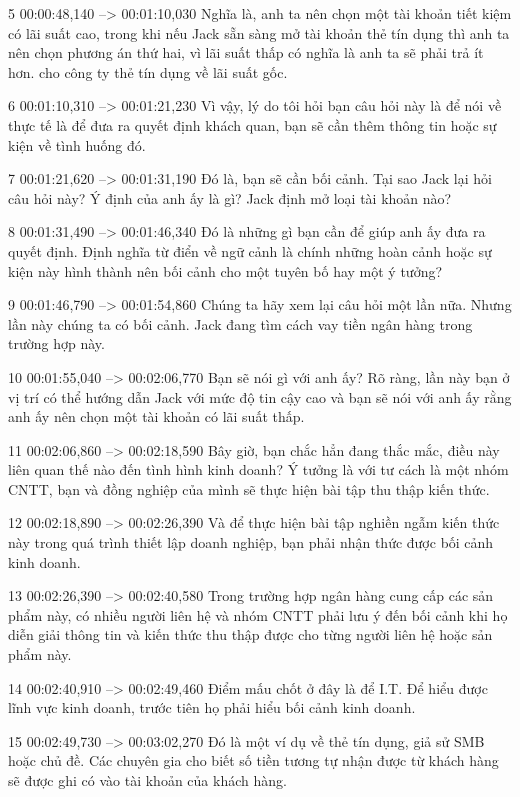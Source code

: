 5
00:00:48,140 --> 00:01:10,030
Nghĩa là, anh ta nên chọn một tài khoản tiết kiệm có lãi suất cao, trong khi nếu Jack sẵn sàng mở tài khoản thẻ tín dụng thì anh ta nên chọn phương án thứ hai, vì lãi suất thấp có nghĩa là anh ta sẽ phải trả ít hơn.  cho công ty thẻ tín dụng về lãi suất gốc.

6
00:01:10,310 --> 00:01:21,230
Vì vậy, lý do tôi hỏi bạn câu hỏi này là để nói về thực tế là để đưa ra quyết định khách quan, bạn sẽ cần thêm thông tin hoặc sự kiện về tình huống đó.

7
00:01:21,620 --> 00:01:31,190
Đó là, bạn sẽ cần bối cảnh.  Tại sao Jack lại hỏi câu hỏi này?  Ý định của anh ấy là gì?  Jack định mở loại tài khoản nào?

8
00:01:31,490 --> 00:01:46,340
Đó là những gì bạn cần để giúp anh ấy đưa ra quyết định.  Định nghĩa từ điển về ngữ cảnh là chính những hoàn cảnh hoặc sự kiện này hình thành nên bối cảnh cho một tuyên bố hay một ý tưởng?

9
00:01:46,790 --> 00:01:54,860
Chúng ta hãy xem lại câu hỏi một lần nữa.  Nhưng lần này chúng ta có bối cảnh.  Jack đang tìm cách vay tiền ngân hàng trong trường hợp này.

10
00:01:55,040 --> 00:02:06,770
Bạn sẽ nói gì với anh ấy?  Rõ ràng, lần này bạn ở vị trí có thể hướng dẫn Jack với mức độ tin cậy cao và bạn sẽ nói với anh ấy rằng anh ấy nên chọn một tài khoản có lãi suất thấp.

11
00:02:06,860 --> 00:02:18,590
Bây giờ, bạn chắc hẳn đang thắc mắc, điều này liên quan thế nào đến tình hình kinh doanh?  Ý tưởng là với tư cách là một nhóm CNTT, bạn và đồng nghiệp của mình sẽ thực hiện bài tập thu thập kiến ​​thức.

12
00:02:18,890 --> 00:02:26,390
Và để thực hiện bài tập nghiền ngẫm kiến ​​thức này trong quá trình thiết lập doanh nghiệp, bạn phải nhận thức được bối cảnh kinh doanh.

13
00:02:26,390 --> 00:02:40,580
Trong trường hợp ngân hàng cung cấp các sản phẩm này, có nhiều người liên hệ và nhóm CNTT phải lưu ý đến bối cảnh khi họ diễn giải thông tin và kiến ​​thức thu thập được cho từng người liên hệ hoặc sản phẩm này.

14
00:02:40,910 --> 00:02:49,460
Điểm mấu chốt ở đây là để I.T.  Để hiểu được lĩnh vực kinh doanh, trước tiên họ phải hiểu bối cảnh kinh doanh.

15
00:02:49,730 --> 00:03:02,270
Đó là một ví dụ về thẻ tín dụng, giả sử SMB hoặc chủ đề.  Các chuyên gia cho biết số tiền tương tự nhận được từ khách hàng sẽ được ghi có vào tài khoản của khách hàng.


